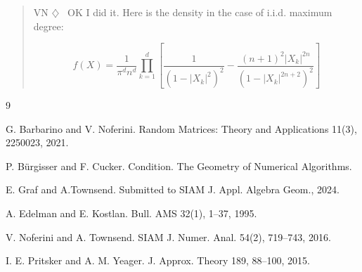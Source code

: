 \documentclass[12pt]{article}
\newenvironment{vn}{\begin{quote}\color{myviolet} \small\sf VN $\diamondsuit$~}{\end{quote}}
\begin{document}
\begin{vn}
    OK I did it. Here is the density in the case of i.i.d. maximum degree:


    \[  f(X) = 
   \frac{1}{\pi^d n^d} \prod_{k=1}^d \left[ \frac{1}{(1 - |X_k|^2)^2} - \frac{(n+1)^2 |X_k|^{2n}}{(1 - |X_k|^{2n+2})^2} \right]
   \]
\end{vn}

\newpage
\begin{thebibliography}{9}


 G. Barbarino and V. Noferini.
\newblock Random Matrices: Theory and Applications 11(3), 2250023, 2021.

 P. B\"{u}rgisser and F. Cucker. \newblock Condition. The Geometry of Numerical Algorithms. 

E. Graf and A.Townsend. 
\newblock Submitted to SIAM J. Appl. Algebra Geom., 2024.

 A. Edelman and E. Kostlan.
\newblock Bull. AMS 32(1), 1--37, 1995.

 V. Noferini and A. Townsend.
\newblock SIAM J. Numer. Anal. 54(2), 719--743, 2016.

 I. E. Pritsker and A. M. Yeager.  \newblock J. Approx. Theory 189, 88--100, 2015.






\end{thebibliography}
\end{document}
